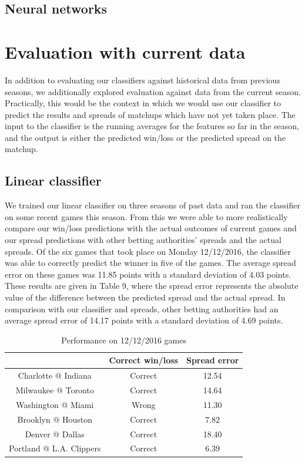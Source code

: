 \documentclass{article}
\begin{document}
\subsection{Neural networks}


\section{Evaluation with current data}
In addition to evaluating our classifiers against historical data from previous seasons, we additionally explored evaluation against data from the current season. Practically, this would be the context in which we would use our classifier to predict the results and spreads of matchups which have not yet taken place. The input to the classifier is the running averages for the features so far in the season, and the output is either the predicted win/loss or the predicted spread on the matchup.

\subsection{Linear classifier}
We trained our linear classifier on three seasons of past data and ran the classifier on some recent games this season. From this we were able to more realistically compare our win/loss predictions with the actual outcomes of current games and our spread predictions with other betting authorities' spreads and the actual spreads. Of the six games that took place on Monday 12/12/2016, the classifier was able to correctly predict the winner in five of the games. The average spread error on these games was 11.85 points with a standard deviation of 4.03 points. These results are given in Table 9, where the spread error represents the absolute value of the difference between the predicted spread and the actual spread. In comparison with our classifier and spreads, other betting authorities had an average spread error of 14.17 points with a standard deviation of 4.69 points.

\begin{table}
  \begin{center}
    \begin{tabular}{ | c | c | c | }
      \hline
                                & Correct win/loss     & Spread error  \\ \hline
      Charlotte @ Indiana       & Correct              & 12.54    \\ \hline
      Milwaukee @ Toronto       & Correct              & 14.64    \\ \hline
      Washington @ Miami        & Wrong                & 11.30     \\ \hline
      Brooklyn @ Houston        & Correct              & 7.82      \\ \hline
      Denver @ Dallas           & Correct              & 18.40    \\ \hline
      Portland @ L.A. Clippers  & Correct              & 6.39    \\ \hline
    \end{tabular}
  \end{center}
  \caption{Performance on 12/12/2016 games}
\end{table}
\end{document}

